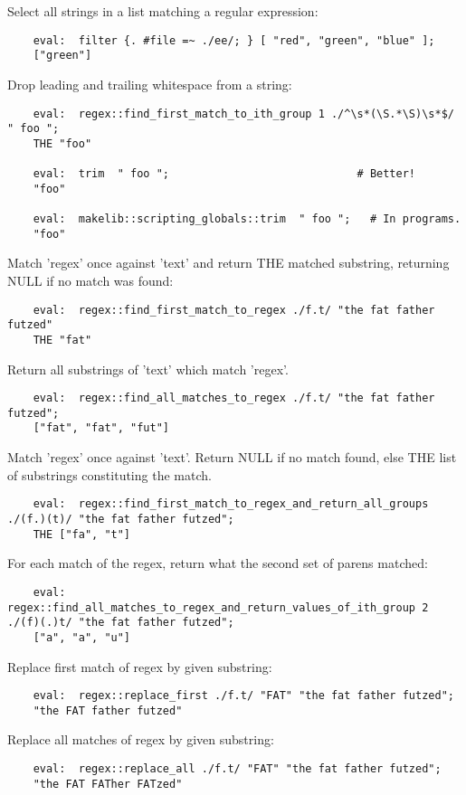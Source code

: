 Select all strings in a list matching a regular expression:
\begin{verbatim}
    eval:  filter {. #file =~ ./ee/; } [ "red", "green", "blue" ];
    ["green"]
\end{verbatim}

Drop leading and trailing whitespace from a string:
\begin{verbatim}
    eval:  regex::find_first_match_to_ith_group 1 ./^\s*(\S.*\S)\s*$/ " foo ";
    THE "foo"

    eval:  trim  " foo ";                             # Better!
    "foo"

    eval:  makelib::scripting_globals::trim  " foo ";   # In programs.
    "foo"
\end{verbatim}


Match 'regex' once against 'text' and return {\sc THE} matched substring,
returning {\sc NULL} if no match was found:
\begin{verbatim}
    eval:  regex::find_first_match_to_regex ./f.t/ "the fat father futzed"
    THE "fat" 
\end{verbatim}


Return all substrings of 'text' which match 'regex'.
\begin{verbatim}
    eval:  regex::find_all_matches_to_regex ./f.t/ "the fat father futzed"; 
    ["fat", "fat", "fut"]
\end{verbatim}

Match 'regex' once against 'text'. 
Return {\sc NULL} if no match found, 
else {\sc THE} list of substrings 
constituting the match.
\begin{verbatim}
    eval:  regex::find_first_match_to_regex_and_return_all_groups ./(f.)(t)/ "the fat father futzed";
    THE ["fa", "t"]
\end{verbatim}

For each match of the regex, return what the second 
set of parens matched:
\begin{verbatim}
    eval:  regex::find_all_matches_to_regex_and_return_values_of_ith_group 2 ./(f)(.)t/ "the fat father futzed";
    ["a", "a", "u"]
\end{verbatim}

Replace first match of regex by given substring:
\begin{verbatim}
    eval:  regex::replace_first ./f.t/ "FAT" "the fat father futzed";
    "the FAT father futzed"
\end{verbatim}

Replace all matches of regex by given substring:
\begin{verbatim}
    eval:  regex::replace_all ./f.t/ "FAT" "the fat father futzed";
    "the FAT FATher FATzed"
\end{verbatim}

